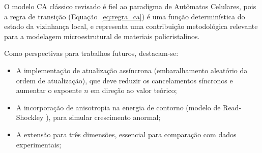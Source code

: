 \documentclass[12pt,a4paper]{article}
\begin{document}
O modelo CA clássico revisado é fiel ao paradigma de Autômatos Celulares, pois a
regra de transição (Equação~\ref{eq:regra_ca}) é uma função determinística do
estado da vizinhança local, e representa uma contribuição metodológica relevante
para a modelagem microestrutural de materiais policristalinos.

Como perspectivas para trabalhos futuros, destacam-se:
\begin{itemize}
    \item A implementação de atualização assíncrona (embaralhamento aleatório da
          ordem de atualização), que deve reduzir os cancelamentos síncronos e
          aumentar o expoente $n$ em direção ao valor teórico;
    \item A incorporação de anisotropia na energia de contorno (modelo de
          Read-Shockley \cite{read1950}), para simular crescimento anormal;
    \item A extensão para três dimensões, essencial para comparação com dados
          experimentais;
\end{itemize}

\newpage
\printbibliography
\end{document}
